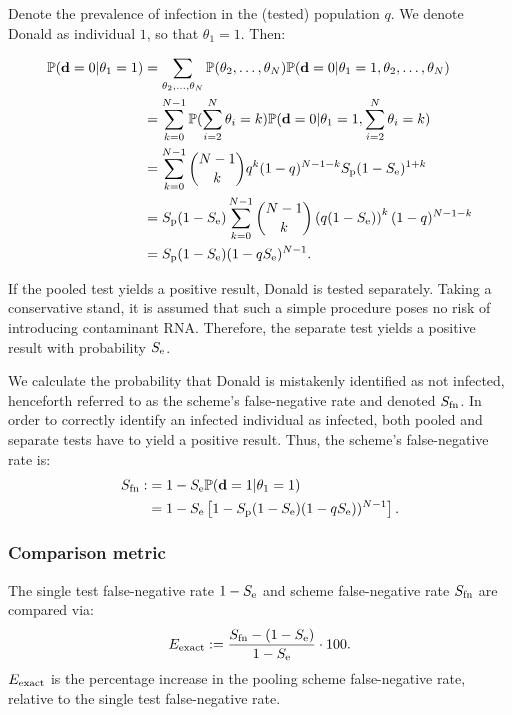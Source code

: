 \documentclass{article}
\begin{document}
Denote the prevalence of infection in the (tested) population $q$. We
denote Donald as individual $1$, so that $\theta_1=1$. Then:

\begin{align}
  \begin{split}
    \mathbb{P}(\mathbf{d}=0|\theta_1=1) &= \sum_{\theta_2,\dots,\theta_N}
    \mathbb{P}(\theta_2,\dots,\theta_N)
    \mathbb{P}(\mathbf{d}=0|\theta_1=1,\theta_2,\dots,\theta_N) \\
    &= \sum_{k=0}^{N-1}\mathbb{P}(\sum_{i=2}^N\theta_i=k)
    \mathbb{P}(\mathbf{d}=0|\theta_1=1,\sum_{i=2}^N\theta_i = k)\\
    &= \sum_{k=0}^{N-1}\binom{N-1}{k}q^k(1-q)^{N-1-k} S_\text{p}(1-S_\text{e})^{1+k}\\
    &= S_\text{p}(1-S_\text{e}) \sum_{k=0}^{N-1}\binom{N-1}{k}
    \left(q(1-S_\text{e})\right)^k(1-q)^{N-1-k}\\
    &= S_\text{p}(1-S_\text{e})(1-qS_\text{e})^{N-1}. \\
  \end{split}
\end{align}

If the pooled test yields a positive result, Donald is tested
separately. Taking a conservative stand,  it is assumed that such a simple
procedure poses no risk of introducing contaminant RNA. Therefore, the
separate test yields a positive result with probability $S_\text{e}$.

We calculate the probability that Donald is mistakenly identified as
not infected, henceforth referred to as the scheme's false-negative
rate and denoted $S_{\text{fn}}$. In order to correctly identify an infected individual
as infected, both pooled and separate tests have to yield a positive
result. Thus, the scheme's false-negative rate is:
\begin{align}\label{eq:sfn}
    \begin{split}
        S_{\text{fn}} :&= 1 - S_\text{e}\mathbb{P}(\mathbf{d}=1|\theta_1=1)\\
        &= 1 - S_\text{e}\left [1 - S_\text{p}(1-S_\text{e})(1-qS_\text{e}))^{N-1}\right].
    \end{split}
\end{align}

\subsubsection*{Comparison metric}
The single test false-negative rate $1-S_\text{e}$ and scheme false-negative
rate $S_{\text{fn}}$ are compared via:
\begin{equation}\label{eq:erel}
E_{\text{{exact}}} := \frac{S_{\text{fn}} - (1-S_\text{e})}{1-S_\text{e}} \cdot 100.
\end{equation}
$E_{\text{{exact}}}$ is the percentage increase in the pooling scheme
false-negative rate, relative to the single test false-negative rate.
\end{document}
